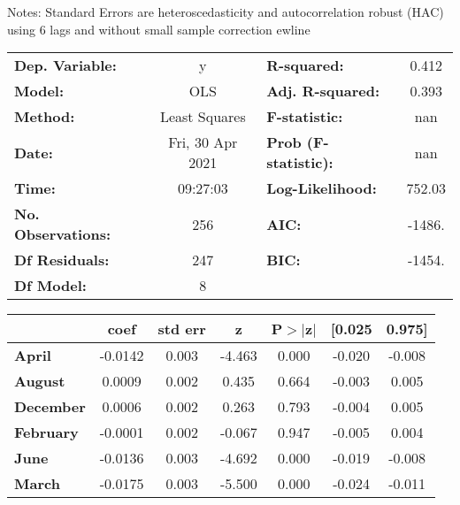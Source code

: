 Notes: \newline
 [1] Standard Errors are heteroscedasticity and autocorrelation robust (HAC) using 6 lags and without small sample correction
ewline\begin{center}
\begin{tabular}{lclc}
\toprule
\textbf{Dep. Variable:}    &        y         & \textbf{  R-squared:         } &     0.412   \\
\textbf{Model:}            &       OLS        & \textbf{  Adj. R-squared:    } &     0.393   \\
\textbf{Method:}           &  Least Squares   & \textbf{  F-statistic:       } &       nan   \\
\textbf{Date:}             & Fri, 30 Apr 2021 & \textbf{  Prob (F-statistic):} &      nan    \\
\textbf{Time:}             &     09:27:03     & \textbf{  Log-Likelihood:    } &    752.03   \\
\textbf{No. Observations:} &         256      & \textbf{  AIC:               } &    -1486.   \\
\textbf{Df Residuals:}     &         247      & \textbf{  BIC:               } &    -1454.   \\
\textbf{Df Model:}         &           8      & \textbf{                     } &             \\
\bottomrule
\end{tabular}
\begin{tabular}{lcccccc}
                  & \textbf{coef} & \textbf{std err} & \textbf{z} & \textbf{P$> |$z$|$} & \textbf{[0.025} & \textbf{0.975]}  \\
\midrule
\textbf{April}    &      -0.0142  &        0.003     &    -4.463  &         0.000        &       -0.020    &       -0.008     \\
\textbf{August}   &       0.0009  &        0.002     &     0.435  &         0.664        &       -0.003    &        0.005     \\
\textbf{December} &       0.0006  &        0.002     &     0.263  &         0.793        &       -0.004    &        0.005     \\
\textbf{February} &      -0.0001  &        0.002     &    -0.067  &         0.947        &       -0.005    &        0.004     \\
\textbf{June}     &      -0.0136  &        0.003     &    -4.692  &         0.000        &       -0.019    &       -0.008     \\
\textbf{March}    &      -0.0175  &        0.003     &    -5.500  &         0.000        &       -0.024    &       -0.011     \\

\end{tabular}
\end{center}

